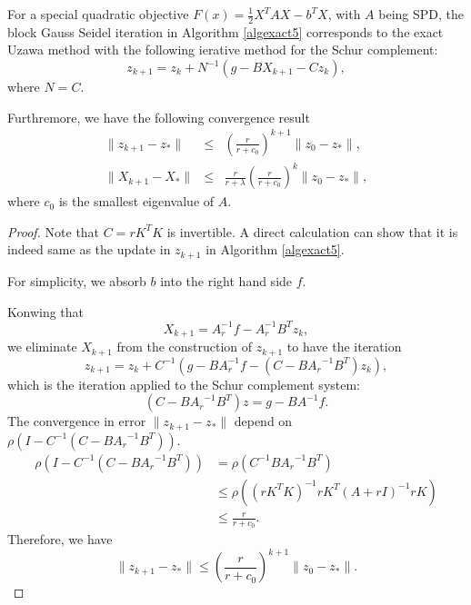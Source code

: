 \begin{theorem}
For a special quadratic objective $F(x) = \frac{1}{2} X^T A X - b^TX$, with $A$ being SPD, the block Gauss Seidel iteration in Algorithm \ref{algexact5} corresponds to the exact Uzawa method with the following ierative method for the Schur complement: 
\begin{equation}
    z_{k+1} = z_{k} + N^{-1} (g - B X_{k+1} - Cz_{k}),
\end{equation}
where $N = C$. 

Furthremore, we have the following convergence result
\begin{eqnarray}
     \| z_{k+1} - z_*\| &\leq& \left( \frac{r}{r +c_0}\right)^{k+1 } \| z_0 -z_*\|, \\
    \|X_{k+1} -X_* \| &\leq& \frac{r}{r + \lambda} \left( \frac{r}{r + c_0}\right)^k \|z_0 - z_* \|,
\end{eqnarray}
where $c_0$ is the smallest eigenvalue of $A$. 
\end{theorem}
\begin{proof}
Note that $C = rK^TK$ is invertible. A direct calculation can show that it is indeed same as the update in $z_{k+1}$ in Algorithm \ref{algexact5}. 

For simplicity, we absorb $b$ into the right hand side $f$. 

Konwing that 
\begin{equation}
    X_{k+1} = A_r^{-1} f - A_r^{-1} B^T z_{k},  
\end{equation}
we eliminate $X_{k+1}$ from the construction of $z_{k+1}$ to have the iteration 
\begin{equation}
    z_{k+1} = z_{k} + C^{-1} \left (g - B A_r^{-1}f - (C - B {A_r}^{-1} B^T) z_k \right),
\end{equation}
which is the iteration applied to the Schur complement system: 
\begin{equation}
    (C - B {A_r}^{-1} B^T) z = g - B A^{-1} f.
\end{equation}
The convergence in error $\| z_{k+1}-z_* \|$ depend on  $\rho( I - C^{-1} (C - B {A_r}^{-1} B^T))$.
\begin{equation*}
\begin{split}
\rho( I - C^{-1} (C - B {A_r}^{-1} B^T)) &=  \rho ( C^{-1} B {A_r}^{-1} B^T) \\
&\leq \rho( (rK^T K)^{-1} rK^T (A + rI)^{-1} rK )   \\ 
& \leq  \frac{r}{r + c_0}.
\end{split}
\end{equation*}
Therefore, we have 
\begin{equation}
    \| z_{k+1} - z_*\| \leq \left( \frac{r}{r +c_0}\right)^{k+1 } \| z_0 -z_*\|. 
\end{equation}

\end{proof}

